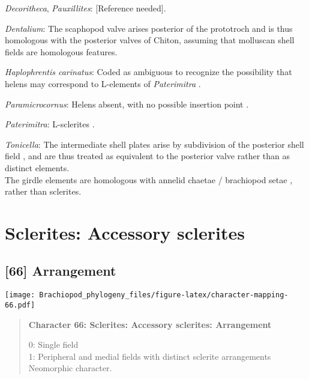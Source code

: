\documentclass[openany]{book}
\theoremstyle{definition}
\theoremstyle{definition}
\theoremstyle{definition}
\theoremstyle{remark}
\begin{document}
\hypertarget{Decoritheca-coding-65}{}
\emph{Decoritheca}, \emph{Pauxillites}: {[}Reference needed{]}.

\hypertarget{Dentalium-coding-65}{}
\emph{Dentalium}: The scaphopod valve arises posterior of the prototroch
and is thus homologous with the posterior valves of Chiton, assuming
that molluscan shell fields are homologous features.

\hypertarget{Haplophrentis_carinatus-coding-65}{}
\emph{Haplophrentis carinatus}: Coded as ambiguous to recognize the
possibility that helens may correspond to L-elements of
\emph{Paterimitra} \citep{Moysiuk2017Hyolithsare}.

\hypertarget{Paramicrocornus-coding-65}{}
\emph{Paramicrocornus}: Helens absent, with no possible insertion point
\citep{Zhang2018Ahyolithid}.

\hypertarget{Paterimitra-coding-65}{}
\emph{Paterimitra}: L-sclerites \citep{Skovsted2009Thescleritome}.

\hypertarget{Tonicella-coding-65}{}
\emph{Tonicella}: The intermediate shell plates arise by subdivision of
the posterior shell field \citep{Wanninger2002C}, and are thus treated
as equivalent to the posterior valve rather than as distinct elements.\\
The girdle elements are homologous with annelid chaetae / brachiopod
setae \citep{Leise1982}, rather than sclerites.

\section{Sclerites: Accessory
sclerites}\label{sclerites-accessory-sclerites}

\subsection*{{[}66{]} Arrangement}\label{arrangement}

\texttt{[image: Brachiopod\_phylogeny\_files/figure-latex/character-mapping-66.pdf]}

\begin{quote}
\textbf{Character 66: Sclerites: Accessory sclerites: Arrangement}

0: Single field\\
1: Peripheral and medial fields with distinct sclerite arrangements\\
Neomorphic character.
\end{quote}
\end{document}

